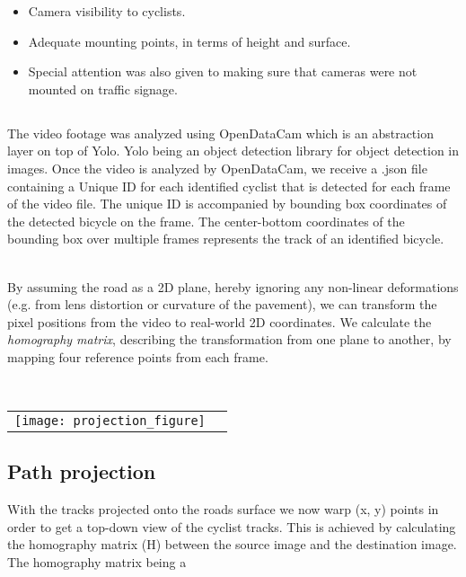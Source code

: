 \begin{itemize}
	\item Camera visibility to cyclists.
	\item Adequate mounting points, in terms of height and surface.
	\item Special attention was also given to making sure that cameras were not mounted on traffic signage.
\end{itemize}

\subsection{}
The video footage was analyzed using OpenDataCam which is an abstraction layer on top of Yolo. Yolo being an object detection library for object detection in images.
Once the video is analyzed by OpenDataCam, we receive a .json file containing a Unique ID for each identified cyclist that is detected for each frame of the video file. 
The unique ID is accompanied by bounding box coordinates of the detected bicycle on the frame. 
The center-bottom coordinates of the bounding box over multiple frames represents the track of an identified bicycle.

\ \\
By assuming the road as a 2D plane, hereby ignoring any non-linear deformations (e.g. from lens distortion or curvature of the pavement), 
we can transform the pixel positions from the video to real-world 2D coordinates. 
We calculate the \textit{homography matrix}, describing the transformation from one plane to another, by mapping four reference points from each frame.

\raggedbottom
\ \\ 
\noindent
\begin{tabular}{@{}cc}
\texttt{[image: projection\_figure]} 
\end{tabular}
\label{projection_figure}

\subsection{Path projection}

With the tracks projected onto the roads surface we now warp (x, y) points in order to get a top-down view of the cyclist tracks.
This is achieved by calculating the homography matrix (H) between the source image and the destination image. The homography matrix being a 
